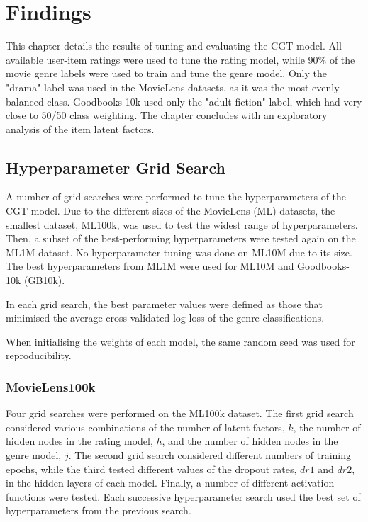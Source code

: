 \chapter{Findings}
\label{results}

This chapter details the results of tuning and evaluating the CGT model. All available user-item ratings were used to tune the rating model, while 90\% of the movie genre labels were used to train and tune the genre model. Only the "drama" label was used in the MovieLens datasets, as it was the most evenly balanced class. Goodbooks-10k used only the "adult-fiction" label, which had very close to 50/50 class weighting. The chapter concludes with an exploratory analysis of the item latent factors.

\section{Hyperparameter Grid Search}
A number of grid searches were performed to tune the hyperparameters of the CGT model. Due to the different sizes of the MovieLens (ML) datasets, the smallest dataset, ML100k, was used to test the widest range of hyperparameters. Then, a subset of the best-performing hyperparameters were tested again on the ML1M dataset. No hyperparameter tuning was done on ML10M due to its size. The best hyperparameters from ML1M were used for ML10M and Goodbooks-10k (GB10k).

In each grid search, the best parameter values were defined as those that minimised the average cross-validated log loss of the genre classifications.

When initialising the weights of each model, the same random seed was used for reproducibility.

\subsection{MovieLens100k}
Four grid searches were performed on the ML100k dataset. The first grid search considered various combinations of the number of latent factors, $k$, the number of hidden nodes in the rating model, $h$, and the number of hidden nodes in the genre model, $j$. The second grid search considered different numbers of training epochs, while the third tested different values of the dropout rates, $dr1$ and $dr2$, in the hidden layers of each model. Finally, a number of different activation functions were tested. Each successive hyperparameter search used the best set of hyperparameters from the previous search.


